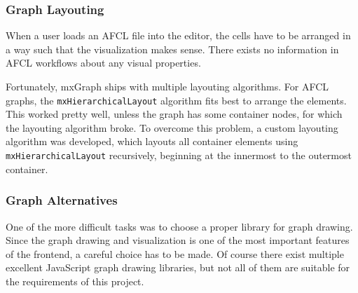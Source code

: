 \documentclass[a4paper,top=25mm,bottom=25mm,12pt,pdftex,halfparskip,twoside,bibtotoc,numbers=noenddot]{scrbook}
\begin{document}

\subsubsection{Graph Layouting}

When a user loads an AFCL file into the editor, the cells have to be arranged in a way such that the visualization makes sense. There exists no information in AFCL workflows about any visual properties. 

Fortunately, mxGraph ships with multiple layouting algorithms.
For AFCL graphs, the \texttt{mxHierarchicalLayout} algorithm fits best to arrange the elements. This worked pretty well, unless the graph has some container nodes, for which the layouting algorithm broke.
To overcome this problem, a custom layouting algorithm was developed, which layouts all container elements using \texttt{mxHierarchicalLayout} recursively, beginning at the innermost to the outermost container.

\label{sec:graph-alternatives}
\subsubsection{Graph Alternatives}

One of the more difficult tasks was to choose a proper library for graph drawing. Since the graph drawing and visualization is one of the most important features of the frontend, a careful choice has to be made. Of course there exist multiple excellent JavaScript graph drawing libraries, but not all of them are suitable for the requirements of this project.
\end{document}
